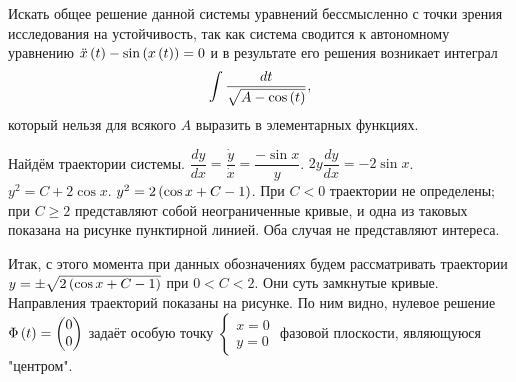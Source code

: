 \documentclass[a5paper,10pt]{article}
\begin{document}
Искать общее решение данной системы уравнений бессмысленно с точки зрения исследования на устойчивость, так как система сводится к автономному уравнению $\ddot{x}\left(t\right) - \sin\left(x\left(t\right)\right) = 0$ и в результате его решения возникает интеграл
$$\int{\frac {dt} {\sqrt{A - \cos\left(t\right)}}},$$
который нельзя для всякого $A$ выразить в элементарных функциях.

Найдём траектории системы. $\dfrac {dy} {dx} = \dfrac {\dot{y}} {\dot{x}} = \dfrac {-\sin{x}} {y}$. $2y \dfrac {dy} {dx} = -2\sin{x}$. $y^{2} = C + 2\cos{x}$. $y^2 = 2\left(\cos x + C - 1\right)$. При $C < 0$ траектории не определены; при $C \ge 2$ представляют собой неограниченные кривые, и одна из таковых показана на рисунке пунктирной линией. Оба случая не представляют интереса.

Итак, с этого момента при данных обозначениях будем рассматривать траектории $y = \pm \sqrt{2\left(\cos{x} + C - 1\right)}$ при $0 < C < 2$. Они суть замкнутые кривые. Направления траекторий показаны на рисунке. По ним видно, нулевое решение $\Phi\left(t\right) = \begin{pmatrix} 0 \\ 0 \end{pmatrix}$ задаёт особую точку $\left\{ \begin{matrix} x = 0 \\ y = 0 \end{matrix} \right.$ фазовой плоскости, являющуюся "центром".
\end{document}

